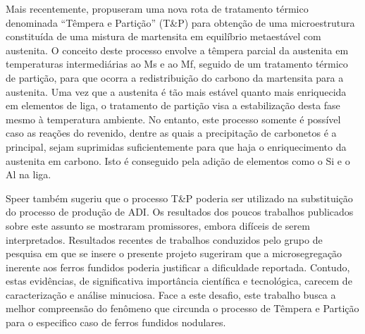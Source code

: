Mais recentemente,  propuseram uma nova rota de tratamento térmico denominada \textquotedblleft{}Têmpera e Partição\textquotedblright{} (T\&P) para obtenção de uma microestrutura constituída de uma mistura de martensita em equilíbrio metaestável com austenita. O conceito deste processo envolve a têmpera parcial da austenita em temperaturas intermediárias ao Ms e ao Mf, seguido de um tratamento térmico de partição, para que ocorra a redistribuição do carbono da martensita para a austenita. Uma vez que a austenita é tão mais estável quanto mais enriquecida em elementos de liga, o tratamento de partição visa a estabilização desta fase mesmo à temperatura ambiente. No entanto, este processo somente é possível caso as reações do revenido, dentre as quais a precipitação de carbonetos é a principal, sejam suprimidas suficientemente para que haja o enriquecimento da austenita em carbono. Isto é conseguido pela adição de elementos como o Si e o Al na liga.

Speer também sugeriu que o processo T\&P poderia ser utilizado na substituição do processo de produção de ADI. Os resultados dos poucos trabalhos publicados sobre este assunto se mostraram promissores, embora difíceis de serem interpretados\cite{Speer2004}. Resultados recentes de trabalhos conduzidos pelo grupo de pesquisa em que se insere o presente projeto sugeriram que a microsegregação inerente aos ferros fundidos poderia justificar a dificuldade reportada. Contudo, estas evidências, de significativa importância científica e tecnológica, carecem de caracterização e análise minuciosa\cite{Anderson2013}. Face a este desafio, este trabalho busca a melhor compreensão do fenômeno que circunda o processo de Têmpera e Partição para o especifico caso de ferros fundidos nodulares.


